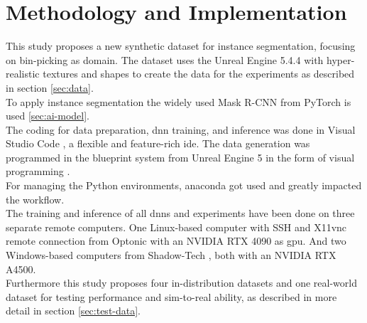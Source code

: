 \chapter{Methodology and Implementation}
\label{chap:kapitel3}
	This study proposes a new synthetic dataset for instance segmentation, focusing on bin-picking as domain. The dataset uses the Unreal Engine 5.4.4 \cite{ue5} with hyper-realistic textures and shapes to create the data for the experiments as described in section \ref{sec:data}.\\
	To apply instance segmentation the widely used Mask R-CNN \cite{Kaiming2017} from PyTorch \cite{pytorch} is used \ref{sec:ai-model}.\\
	The coding for data preparation, \ac{dnn} training, and inference was done in Visual Studio Code \cite{vscode}, a flexible and feature-rich \ac{ide}. The data generation was programmed in the blueprint system from Unreal Engine 5 \cite{ue5} in the form of visual programming \cite{Romero2022}.\\
	For managing the Python environments, anaconda \cite{anaconda} got used and greatly impacted the workflow.\\
	The training and inference of all \ac{dnn}s and experiments have been done on three separate remote computers. One Linux-based computer with SSH and X11vnc remote connection from Optonic \cite{optonic} with an NVIDIA RTX 4090 as \ac{gpu}. And two Windows-based computers from Shadow-Tech \cite{shadow}, both with an NVIDIA RTX A4500.\\
	Furthermore this study proposes four in-distribution datasets and one real-world dataset for testing performance and sim-to-real ability, as described in more detail in section \ref{sec:test-data}.

	
	
	
